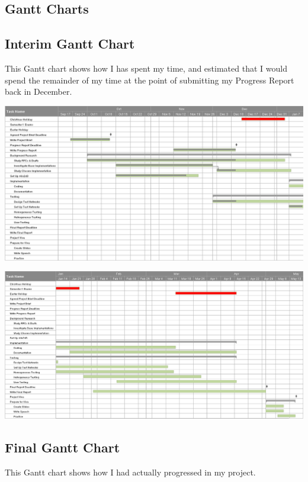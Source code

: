 \documentclass[12pt]{report}
\begin{document}
\pagebreak
\begin{landscape} 

\section{Gantt Charts}
\subsection{Interim Gantt Chart}
This Gantt chart shows how I has spent my time, and estimated that I would
spend the remainder of my time at the point of submitting my Progress Report
back in December. 

\begin{center}
  \includegraphics[width=\linewidth]{../Gantt/GanttPart1.png}
\end{center}

\begin{center}
  \includegraphics[width=\linewidth]{../Gantt/GanttPart2.png}
\end{center}

\pagebreak

\subsection{Final Gantt Chart}
This Gantt chart shows how I had actually progressed in my project.


\end{landscape}
\end{document}
